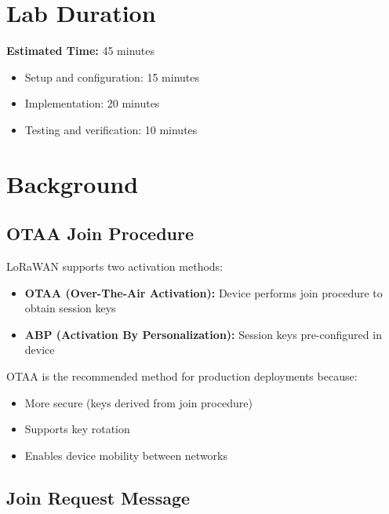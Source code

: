 \documentclass[11pt,a4paper]{article}
\begin{document}
\section{Lab Duration}

\textbf{Estimated Time:} 45 minutes

\begin{itemize}
    \item Setup and configuration: 15 minutes
    \item Implementation: 20 minutes
    \item Testing and verification: 10 minutes
\end{itemize}

\section{Background}

\subsection{OTAA Join Procedure}

LoRaWAN supports two activation methods:
\begin{itemize}
    \item \textbf{OTAA (Over-The-Air Activation):} Device performs join procedure to obtain session keys
    \item \textbf{ABP (Activation By Personalization):} Session keys pre-configured in device
\end{itemize}

OTAA is the recommended method for production deployments because:
\begin{itemize}
    \item More secure (keys derived from join procedure)
    \item Supports key rotation
    \item Enables device mobility between networks
\end{itemize}

\subsection{Join Request Message}
\end{document}
